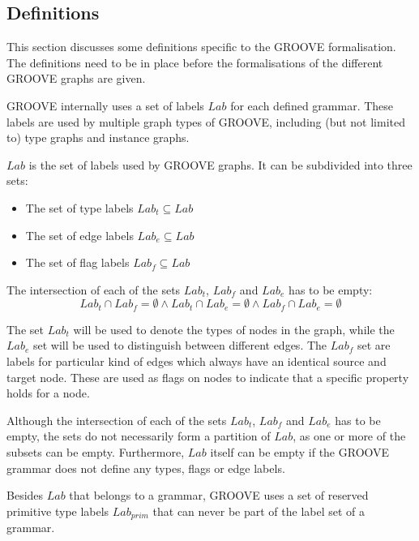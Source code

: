 \subsection{Definitions}
\label{subsec:formalisations:groove_formalisation:definitions}
This section discusses some definitions specific to the GROOVE formalisation. The definitions need to be in place before the formalisations of the different GROOVE graphs are given.

GROOVE internally uses a set of labels $Lab$ for each defined grammar. These labels are used by multiple graph types of GROOVE, including (but not limited to) type graphs and instance graphs.

\begin{defin}[Labels]
\label{defin:formalisations:groove_formalisation:definitions:labels}
$Lab$ is the set of labels used by GROOVE graphs. It can be subdivided into three sets:
\begin{itemize}
    \item The set of type labels $Lab_t \subseteq Lab$
    \item The set of edge labels $Lab_e \subseteq Lab$
    \item The set of flag labels $Lab_f \subseteq Lab$
\end{itemize}

The intersection of each of the sets $Lab_t$, $Lab_f$ and $Lab_e$ has to be empty:
\begin{equation*}
    Lab_t \cap Lab_f = \emptyset \land Lab_t \cap Lab_e = \emptyset \land Lab_f \cap Lab_e = \emptyset
\end{equation*}

\end{defin}

The set $Lab_t$ will be used to denote the types of nodes in the graph, while the $Lab_e$ set will be used to distinguish between different edges. The $Lab_f$ set are labels for particular kind of edges which always have an identical source and target node. These are used as flags on nodes to indicate that a specific property holds for a node.

Although the intersection of each of the sets $Lab_t$, $Lab_f$ and $Lab_e$ has to be empty, the sets do not necessarily form a partition of $Lab$, as one or more of the subsets can be empty. Furthermore, $Lab$ itself can be empty if the GROOVE grammar does not define any types, flags or edge labels.

Besides $Lab$ that belongs to a grammar, GROOVE uses a set of reserved primitive type labels $Lab_{prim}$ that can never be part of the label set of a grammar.

